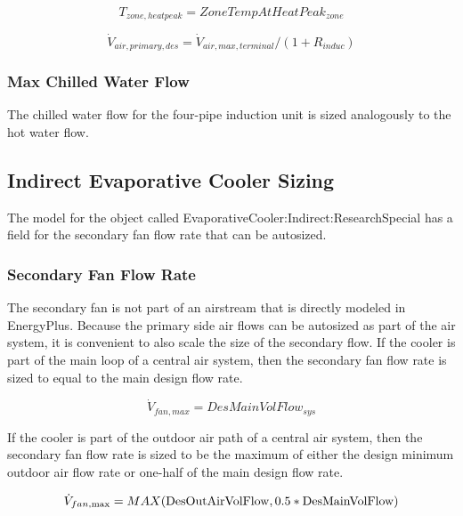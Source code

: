 \begin{equation}
{T_{zone,heatpeak}} = ZoneTempAtHeatPea{k_{zone}}
\end{equation}

\begin{equation}
{\dot V_{air,primary,des}} = {\dot V_{air,max,terminal}}/(1 + {R_{induc}})
\end{equation}

\subsubsection{Max Chilled Water Flow}\label{max-chilled-water-flow}

The chilled water flow for the four-pipe induction unit is sized analogously to the hot water flow.

\subsection{Indirect Evaporative Cooler Sizing}\label{indirect-evaporative-cooler-sizing}

The model for the object called EvaporativeCooler:Indirect:ResearchSpecial has a field for the secondary fan flow rate that can be autosized.

\subsubsection{Secondary Fan Flow Rate}\label{secondary-fan-flow-rate}

The secondary fan is not part of an airstream that is directly modeled in EnergyPlus. Because the primary side air flows can be autosized as part of the air system, it is convenient to also scale the size of the secondary flow. If the cooler is part of the main loop of a central air system, then the secondary fan flow rate is sized to equal to the main design flow rate.

\begin{equation}
\dot V_{fan,max} = DesMainVolFlow_{sys}
\end{equation}

If the cooler is part of the outdoor air path of a central air system, then the secondary fan flow rate is sized to be the maximum of either the design minimum outdoor air flow rate or one-half of the main design flow rate.

\begin{equation}
{\dot V_{fan,\max }} = MAX({\rm{DesOutAirVolFlow, 0}}{\rm{.5*DesMainVolFlow)}}
\end{equation}

